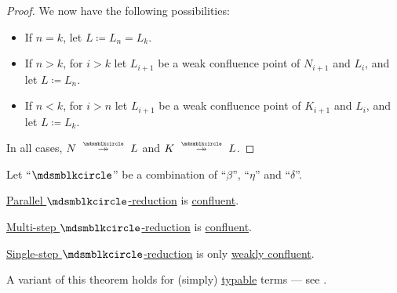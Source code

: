 \begin{proof}
  We now have the following possibilities:
  \begin{itemize}
    \item If \( n = k \), let \( L \coloneqq L_n = L_k \).
    \item If \( n > k \), for \( i > k \) let \( L_{i+1} \) be a weak confluence point of \( N_{i+1} \) and \( L_i \), and let \( L \coloneqq L_n \).
    \item If \( n < k \), for \( i > n \) let \( L_{i+1} \) be a weak confluence point of \( K_{i+1} \) and \( L_i \), and let \( L \coloneqq L_k \).
  \end{itemize}

  In all cases, \( N \pred* L \) and \( K \pred* L \).
\end{proof}

\begin{theorem}\label{thm:church_rosser_theorem}
  Let \enquote{\( {\Anon} \)} be a combination of \enquote{\( \beta \)}, \enquote{\( \eta \)} and \enquote{\( \delta \)}.

  \begin{thmenum}
     \hyperref[def:parallel_reduction]{Parallel \( \Anon \)-reduction} is \hyperref[def:reduction_confluence]{confluent}.

     \hyperref[def:lambda_term_reduction/multi]{Multi-step \( \Anon \)-reduction} is \hyperref[def:reduction_confluence]{confluent}.

     \hyperref[def:lambda_term_reduction/single]{Single-step \( \Anon \)-reduction} is only \hyperref[def:reduction_confluence]{weakly confluent}.
  \end{thmenum}
\end{theorem}
\begin{comments}
  \item A variant of this theorem holds for (simply) \hyperref[def:typability]{typable} terms --- see .
\end{comments}
